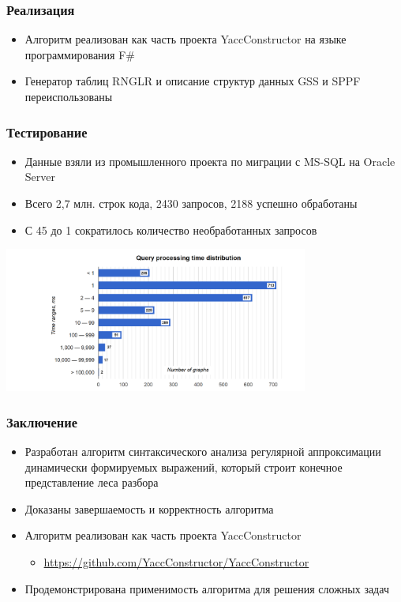 \documentclass{beamer}
\begin{document}
\begin{frame}
  \transwipe[direction=90]
  \frametitle{Реализация}
  \begin{itemize}
    \item Алгоритм реализован как часть проекта YaccConstructor на языке 
программирования F\#
    \item Генератор таблиц RNGLR и описание структур данных GSS и SPPF 
переиспользованы
 \end{itemize}
\end{frame}

\begin{frame}[t]
  \transwipe[direction=90]
  \frametitle{Тестирование}
  \begin{itemize}
    \item Данные взяли из промышленного проекта по миграции с MS-SQL на Oracle Server 
    \item Всего 2,7 млн. строк кода, 2430 запросов, 2188 успешно обработаны
    \item С 45 до 1 сократилось количество необработанных запросов
  \end{itemize}
  \includegraphics[width=10cm]{pictures/dist.png}
\end{frame}


\begin{frame}
  \transwipe[direction=90]
  \frametitle{Заключение}
  \begin{itemize}
    \item Разработан алгоритм синтаксического анализа регулярной аппроксимации 
динамически формируемых выражений, который строит конечное представление леса 
разбора 
    \item Доказаны завершаемость и корректность алгоритма
    \item Алгоритм реализован как часть проекта YaccConstructor
    \begin{itemize}
      \item \url{https://github.com/YaccConstructor/YaccConstructor}
    \end{itemize}
    \item Продемонстрирована применимость алгоритма для решения 
сложных задач
  \end{itemize}
\end{frame}
\end{document}
